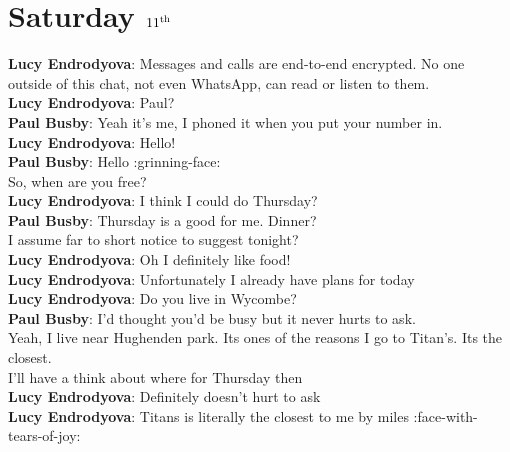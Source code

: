 
\section*{Saturday $11\textsuperscript{th}$}
\textbf{Lucy  Endrodyova}: Messages and calls are end-to-end encrypted. No one outside of this chat, not even WhatsApp, can read or listen to them.\\
\textbf{Lucy  Endrodyova}: Paul?\\
\textbf{Paul Busby}: Yeah it’s me, I phoned it when you put your number in.\\
\textbf{Lucy  Endrodyova}: Hello!\\
\textbf{Paul Busby}: Hello :grinning-face:\\
So, when are you free?\\\textbf{Lucy  Endrodyova}: I think I could do Thursday?\\
\textbf{Paul Busby}: Thursday is a good for me. Dinner?\\
I assume far to short notice to suggest tonight?\\\textbf{Lucy  Endrodyova}: Oh I definitely like food!\\
\textbf{Lucy  Endrodyova}: Unfortunately I already have plans for today\\
\textbf{Lucy  Endrodyova}: Do you live in Wycombe?\\
\textbf{Paul Busby}: I'd thought you'd be busy but it never hurts to ask.\\
Yeah, I live near Hughenden park. Its ones of the reasons I go to Titan's. Its the closest.\\I'll have a think about where for Thursday then\\\textbf{Lucy  Endrodyova}: Definitely doesn't hurt to ask\\
\textbf{Lucy  Endrodyova}: Titans is literally the closest to me by miles :face-with-tears-of-joy:\\
